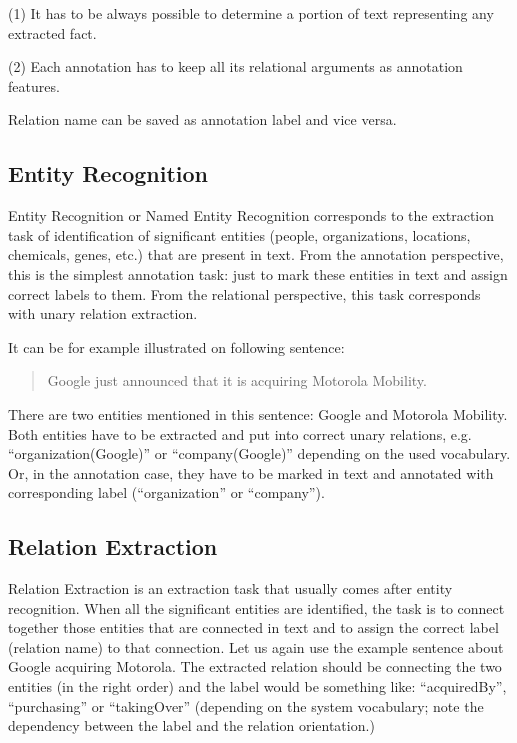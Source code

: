 (1) It has to be always possible to determine a portion of text representing any extracted fact.

(2) Each annotation has to keep all its relational arguments as annotation features.

Relation name can be saved as annotation label and vice versa.

\subsection{Entity Recognition} \label{sec:problems_entity_recognition}

Entity Recognition or Named Entity Recognition corresponds to the extraction task of identification of significant entities (people, organizations, locations, chemicals, genes, etc.) that are present in text. From the annotation perspective, this is the simplest annotation task: just to mark these entities in text and assign correct labels to them. From the relational perspective, this task corresponds with unary relation extraction.

It can be for example illustrated on following sentence:

\begin{quote}
Google just announced that it is acquiring Motorola Mobility.
\end{quote}


There are two entities mentioned in this sentence: Google and Motorola Mobility. Both entities have to be extracted and put into correct unary relations, e.g. “organization(Google)” or “company(Google)” depending on the used vocabulary. Or, in the annotation case, they have to be marked in text and annotated with corresponding label (“organization” or “company”).

\subsection{Relation Extraction}

Relation Extraction is an extraction task that usually comes after entity recognition. When all the significant entities are identified, the task is to connect together those entities that are connected in text and to assign the correct label (relation name) to that connection. Let us again use the example sentence about Google acquiring Motorola. The extracted relation should be connecting the two entities (in the right order) and the label would be something like: “acquiredBy”, “purchasing” or “takingOver” (depending on the system vocabulary; note the dependency between the label and the relation orientation.)

